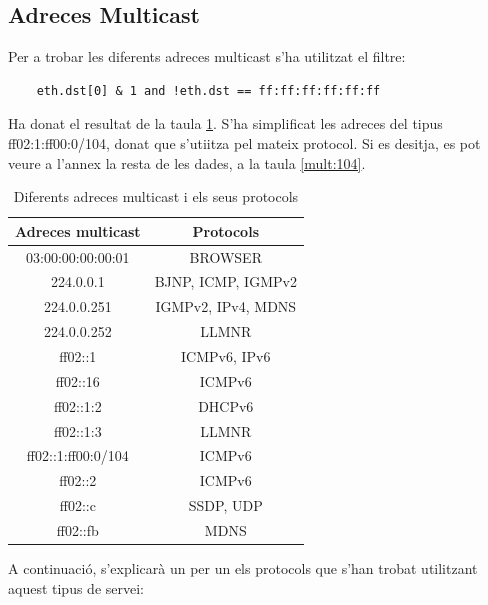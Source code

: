 \documentclass{article}
\begin{document}
\subsection{Adreces Multicast}
Per a trobar les diferents adreces multicast s'ha utilitzat el filtre:
\begin{lstlisting}
	eth.dst[0] & 1 and !eth.dst == ff:ff:ff:ff:ff:ff
\end{lstlisting}
Ha donat el resultat de la taula \ref{mult}. S'ha simplificat les adreces del tipus
ff02:1:ff00:0/104, donat que s'utiitza pel mateix protocol. Si es desitja, es pot
veure a l'annex la resta de les dades, a la taula \ref{mult:104}.
\begin{table}[!h]
\centering
\begin{tabular}{cc}
Adreces multicast &Protocols\\
\hline
03:00:00:00:00:01 &BROWSER\\
224.0.0.1 &BJNP, ICMP, IGMPv2\\
224.0.0.251 &IGMPv2, IPv4, MDNS\\
224.0.0.252 &LLMNR\\
ff02::1 &ICMPv6, IPv6\\
ff02::16 &ICMPv6\\
ff02::1:2 &DHCPv6\\
ff02::1:3 &LLMNR\\
ff02::1:ff00:0/104 &ICMPv6\\
ff02::2 &ICMPv6\\
ff02::c &SSDP, UDP\\
ff02::fb &MDNS\\
\end{tabular}
\caption{Diferents adreces multicast i els seus protocols}
\label{mult}
\end{table}
A continuació, s'explicarà un per un els protocols que s'han trobat 
utilitzant aquest tipus de servei:\\
\end{document}
